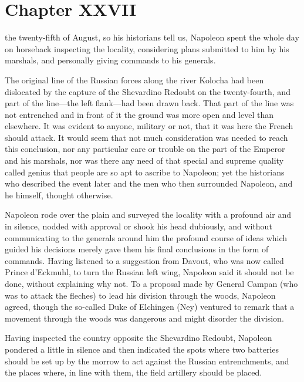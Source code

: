 \chapter*{Chapter XXVII} \ifaudio {}
\fi

 the twenty-fifth of August, so his historians tell us,
Napoleon spent the whole day on horseback inspecting the
locality, considering plans submitted to him by his marshals, and
personally giving commands to his generals.

The original line of the Russian forces along the river Kolocha
had been dislocated by the capture of the Shevardino Redoubt on
the twenty-fourth, and part of the line---the left flank---had
been drawn back. That part of the line was not entrenched and in
front of it the ground was more open and level than elsewhere. It
was evident to anyone, military or not, that it was here the
French should attack. It would seem that not much consideration
was needed to reach this conclusion, nor any particular care or
trouble on the part of the Emperor and his marshals, nor was
there any need of that special and supreme quality called genius
that people are so apt to ascribe to Napoleon; yet the historians
who described the event later and the men who then surrounded
Napoleon, and he himself, thought otherwise.

Napoleon rode over the plain and surveyed the locality with a
profound air and in silence, nodded with approval or shook his
head dubiously, and without communicating to the generals around
him the profound course of ideas which guided his decisions
merely gave them his final conclusions in the form of
commands. Having listened to a suggestion from Davout, who was
now called Prince d'Eckmuhl, to turn the Russian left wing,
Napoleon said it should not be done, without explaining why
not. To a proposal made by General Campan (who was to attack the
fleches) to lead his division through the woods, Napoleon agreed,
though the so-called Duke of Elchingen (Ney) ventured to remark
that a movement through the woods was dangerous and might
disorder the division.

Having inspected the country opposite the Shevardino Redoubt,
Napoleon pondered a little in silence and then indicated the
spots where two batteries should be set up by the morrow to act
against the Russian entrenchments, and the places where, in line
with them, the field artillery should be placed.

